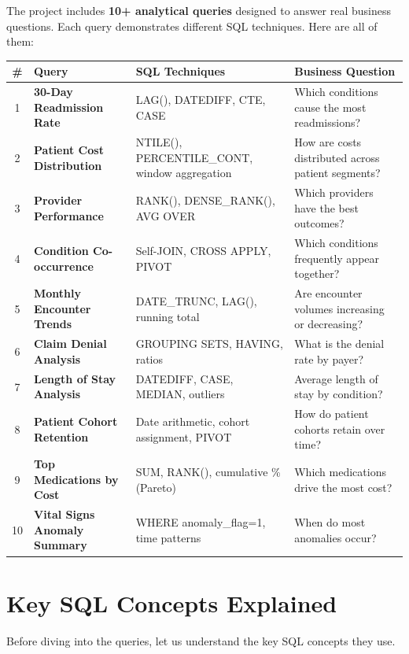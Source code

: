 \documentclass[12pt, a4paper, oneside]{report}
\begin{document}
The project includes \textbf{10+ analytical queries} designed to answer real business questions. Each query demonstrates different SQL techniques. Here are all of them:

\begin{longtable}{c >{\bfseries}p{3.5cm} p{4cm} p{4.5cm}}
    \toprule
    \textbf{\#} & \textbf{Query} & \textbf{SQL Techniques} & \textbf{Business Question} \\
    \midrule
    \endhead
    1 & 30-Day Readmission Rate & LAG(), DATEDIFF, CTE, CASE & Which conditions cause the most readmissions? \\
    \midrule
    2 & Patient Cost Distribution & NTILE(), PERCENTILE\_CONT, window aggregation & How are costs distributed across patient segments? \\
    \midrule
    3 & Provider Performance & RANK(), DENSE\_RANK(), AVG OVER & Which providers have the best outcomes? \\
    \midrule
    4 & Condition Co-occurrence & Self-JOIN, CROSS APPLY, PIVOT & Which conditions frequently appear together? \\
    \midrule
    5 & Monthly Encounter Trends & DATE\_TRUNC, LAG(), running total & Are encounter volumes increasing or decreasing? \\
    \midrule
    6 & Claim Denial Analysis & GROUPING SETS, HAVING, ratios & What is the denial rate by payer? \\
    \midrule
    7 & Length of Stay Analysis & DATEDIFF, CASE, MEDIAN, outliers & Average length of stay by condition? \\
    \midrule
    8 & Patient Cohort Retention & Date arithmetic, cohort assignment, PIVOT & How do patient cohorts retain over time? \\
    \midrule
    9 & Top Medications by Cost & SUM, RANK(), cumulative \% (Pareto) & Which medications drive the most cost? \\
    \midrule
    10 & Vital Signs Anomaly Summary & WHERE anomaly\_flag=1, time patterns & When do most anomalies occur? \\
    \bottomrule
\end{longtable}

\section{Key SQL Concepts Explained}

Before diving into the queries, let us understand the key SQL concepts they use.
\end{document}
